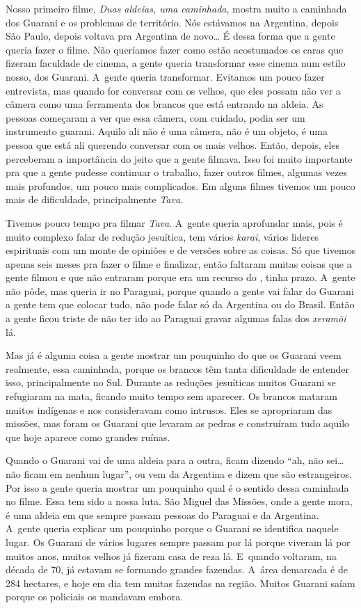Nosso primeiro filme, \emph{Duas aldeias, uma caminhada}, mostra muito a
caminhada dos Guarani e os problemas de território. Nós estávamos na
Argentina, depois São Paulo, depois voltava pra Argentina de novo\ldots{} É
dessa forma que a gente queria fazer o filme. Não queríamos fazer como
estão acostumados os caras que fizeram faculdade de cinema, a gente
queria transformar esse cinema num estilo nosso, dos Guarani. A~gente
queria transformar. Evitamos um pouco fazer entrevista, mas quando for
conversar com os velhos, que eles possam não ver a câmera como uma
ferramenta dos brancos que está entrando na aldeia. As pessoas começaram
a ver que essa câmera, com cuidado, podia ser um instrumento guarani.
Aquilo ali não é uma câmera, não é um objeto, é uma pessoa que está ali
querendo conversar com os mais velhos. Então, depois, eles perceberam a
importância do jeito que a gente filmava. Isso foi muito importante pra
que a gente pudesse continuar o trabalho, fazer outros filmes, algumas
vezes mais profundos, um pouco mais complicados. Em alguns filmes
tivemos um pouco mais de dificuldade, principalmente \emph{Tava}.

Tivemos pouco tempo pra filmar \emph{Tava}. A~gente queria aprofundar mais,
pois é muito complexo falar de redução jesuítica, tem vários \emph{karai},
vários lideres espirituais com um monte de opiniões e de versões sobre
as coisas. Só que tivemos apenas seis meses pra fazer o filme e
finalizar, então faltaram muitas coisas que a gente filmou e que não
entraram porque era um recurso do , tinha prazo. A~gente não pôde,
mas queria ir no Paraguai, porque quando a gente vai falar do Guarani a
gente tem que colocar tudo, não pode falar só da Argentina ou do
Brasil. Então a gente ficou triste de não ter ido ao Paraguai gravar
algumas falas dos \emph{xeramõi} lá. 

Mas já é alguma coisa a gente mostrar um pouquinho do que os Guarani
veem realmente, essa caminhada, porque os brancos têm tanta dificuldade
de entender isso, principalmente no Sul. Durante as reduções jesuíticas
muitos Guarani se refugiaram na mata, ficando muito tempo sem
aparecer. Os brancos mataram muitos indígenas e nos consideravam como
intrusos. Eles se apropriaram das missões, mas foram os Guarani que
levaram as pedras e construíram tudo aquilo que hoje aparece como
grandes ruínas.

Quando o Guarani vai de uma aldeia para a outra, ficam dizendo ``ah, não
sei\ldots{} não ficam em nenhum lugar'', ou vem da Argentina e dizem que são
estrangeiros. Por isso a gente queria mostrar um pouquinho qual é o
sentido dessa caminhada no filme. Essa tem sido a nossa luta. São
Miguel das Missões, onde a gente mora, é uma aldeia em que sempre
passam pessoas do Paraguai e da Argentina. A~gente queria explicar um
pouquinho porque o Guarani se identifica naquele lugar. Os Guarani de
vários lugares sempre passam por lá porque viveram lá por muitos anos,
muitos velhos já fizeram casa de reza lá. E~quando voltaram, na década
de 70, já estavam se formando grandes fazendas. A~área demarcada é de
284 hectares, e hoje em dia tem muitas fazendas na região. Muitos
Guarani saíam porque os policiais os mandavam embora.

